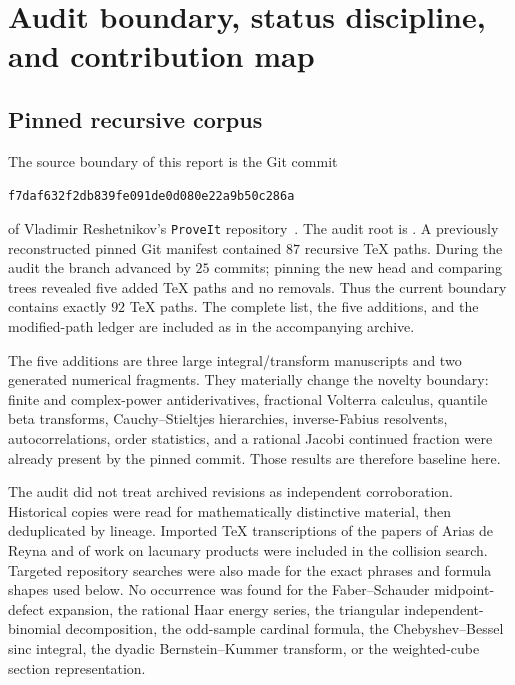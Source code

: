 \documentclass[11pt,oneside]{article}
\theoremstyle{definition}
\theoremstyle{remark}
\newcommand{\1}{\mathbf 1}
\newcommand{\repo}{\texttt{ProveIt}}
\begin{document}
\tableofcontents
\clearpage

\section{Audit boundary, status discipline, and contribution map}
\label{sec:audit}

\subsection{Pinned recursive corpus}

The source boundary of this report is the Git commit
\begin{center}
\nolinkurl{f7daf632f2db839fe091de0d080e22a9b50c286a}
\end{center}
of Vladimir Reshetnikov's \repo{} repository~\cite{proveit}.  The audit root is
.  A previously reconstructed pinned Git
manifest contained $87$ recursive TeX paths.  During the audit the branch
advanced by $25$ commits; pinning the new head and comparing trees revealed
five added TeX paths and no removals.  Thus the current boundary contains
exactly $92$ TeX paths.  The complete list, the five additions, and the
modified-path ledger are included as
 in the accompanying archive.

The five additions are three large integral/transform manuscripts and two
generated numerical fragments.  They materially change the novelty boundary:
finite and complex-power antiderivatives, fractional Volterra calculus,
quantile beta transforms, Cauchy--Stieltjes hierarchies, inverse-Fabius
resolvents, autocorrelations, order statistics, and a rational Jacobi
continued fraction were already present by the pinned commit.  Those results
are therefore baseline here.

The audit did not treat archived revisions as independent corroboration.
Historical copies were read for mathematically distinctive material, then
deduplicated by lineage.  Imported TeX transcriptions of the papers of Arias
de Reyna and of work on lacunary products were included in the collision
search.  Targeted repository searches were also made for the exact phrases
and formula shapes used below.  No occurrence was found for the Faber--Schauder
midpoint-defect expansion, the rational Haar energy series, the triangular
independent-binomial decomposition, the odd-sample cardinal formula, the
Chebyshev--Bessel sinc integral, the dyadic Bernstein--Kummer transform, or the
weighted-cube section representation.
\end{document}
